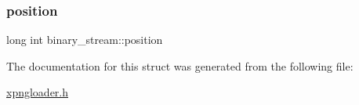 \mbox{\label{structbinary__stream_ac81f4ba9f676c1bb011642915884ee57}} 
\subsubsection{\texorpdfstring{position}{position}}
{\footnotesize\ttfamily long int binary\+\_\+stream\+::position}



The documentation for this struct was generated from the following file\+:\begin{DoxyCompactItemize}
\item 
\hyperlink{xpngloader_8h}{xpngloader.\+h}\end{DoxyCompactItemize}
